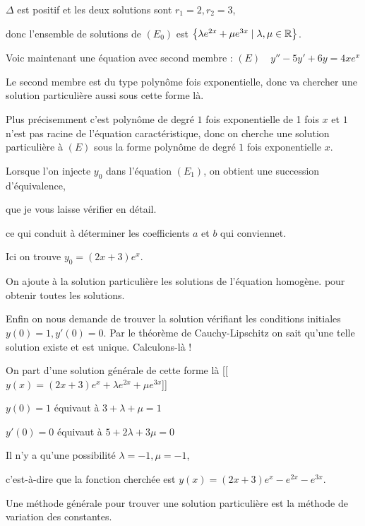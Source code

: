 \change
$\Delta$ est positif et les deux solutions sont $r_1=2, r_2=3$,

\change
donc l'ensemble de solutions de $(E_0)$ est $\big\{\lambda e^{2x}+ \mu e^{3x} \mid 
\lambda, \mu \in \mathbb{R}\big\}$. 

\change

Voic maintenant une équation avec second membre :
$(E) \quad y''-5y'+6y=4xe^x$


Le second membre est du type polynôme fois
exponentielle, donc va chercher une solution particulière aussi sous cette forme là.

\change
Plus précisemment c'est polynôme de degré $1$ fois exponentielle de 
1 fois $x$ et $1$ n'est pas racine de l'équation caractéristique, donc 
on cherche 
 une solution particulière à $(E)$ sous la forme 
 polynôme de degré $1$ fois exponentielle $x$.
 
\change

Lorsque l'on injecte $y_0$ dans l'équation $(E_1)$, on obtient 
une succession d'équivalence,

que je vous laisse vérifier en détail.

\change

\change

\change
ce qui conduit à déterminer les coefficients $a$ et $b$ qui conviennet.

Ici on trouve $y_0=(2x+3)e^x$. 

\change
On ajoute à la solution particulière les solutions de l'équation homogène.
pour obtenir toutes les solutions.

\change
Enfin on nous demande de trouver la solution vérifiant les conditions initiales 
$y(0)=1, y'(0)=0$. Par le théorème de Cauchy-Lipschitz on sait qu'une 
telle solution existe et est unique.
Calculons-là !

\change
On part d'une solution générale de cette forme là 
[[$y(x) = (2x+3)e^x+\lambda e^{2x} + \mu e^{3x}$]]


$y(0)=1$ équivaut à  $3+\lambda+\mu=1$

\change
$y'(0)=0$ équivaut à $5+2\lambda+3\mu=0$

\change
Il n'y a qu'une possibilité $\lambda=-1, \mu=-1$, 

\change
c'est-à-dire que la fonction cherchée est 
$y(x)=(2x+3)e^{x}-e^{2x}-e^{3x}$. 


\diapo

Une méthode générale pour trouver une solution particulière est
la méthode de variation des constantes.

